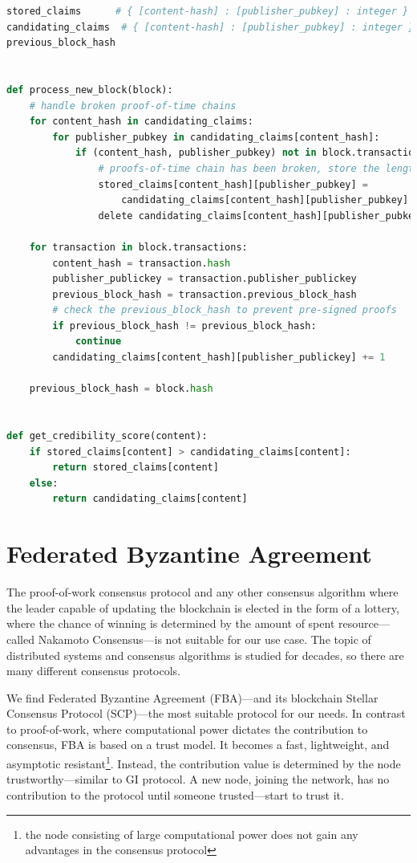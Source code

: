 \begin{lstlisting}[language=Python, caption=Processing new block, label=listing_process_new_block,float,floatplacement=H]
stored_claims      # { [content-hash] : [publisher_pubkey] : integer }
candidating_claims  # { [content-hash] : [publisher_pubkey] : integer }
previous_block_hash


def process_new_block(block):
    # handle broken proof-of-time chains
    for content_hash in candidating_claims:
        for publisher_pubkey in candidating_claims[content_hash]:
            if (content_hash, publisher_pubkey) not in block.transactions:
                # proofs-of-time chain has been broken, store the length
                stored_claims[content_hash][publisher_pubkey] = 
                    candidating_claims[content_hash][publisher_pubkey]
                delete candidating_claims[content_hash][publisher_pubkey]

    for transaction in block.transactions:
        content_hash = transaction.hash
        publisher_publickey = transaction.publisher_publickey
        previous_block_hash = transaction.previous_block_hash
        # check the previous_block_hash to prevent pre-signed proofs
        if previous_block_hash != previous_block_hash:
            continue
        candidating_claims[content_hash][publisher_publickey] += 1

    previous_block_hash = block.hash


def get_credibility_score(content):
    if stored_claims[content] > candidating_claims[content]:
        return stored_claims[content]
    else:
        return candidating_claims[content]

\end{lstlisting}




\section{Federated Byzantine Agreement}
\label{FBA}
The proof-of-work consensus protocol and any other consensus algorithm where the leader capable of updating the blockchain is elected in the form of a lottery, where the chance of winning is determined by the amount of spent resource––called Nakamoto Consensus––is not suitable for our use case. The topic of distributed systems and consensus algorithms is studied for decades, so there are many different consensus protocols.

We find Federated Byzantine Agreement (FBA)––and its blockchain Stellar Consensus Protocol (SCP)\cite{mazieres2015stellar}––the most suitable protocol for our needs. In contrast to proof-of-work, where computational power dictates the contribution to consensus, FBA is based on a trust model. It becomes a fast, lightweight, and asymptotic resistant\footnote{the node consisting of large computational power does not gain any advantages in the consensus protocol}. Instead, the contribution value is determined by the node trustworthy––similar to GI protocol. A new node, joining the network, has no contribution to the protocol until someone trusted––start to trust it.

